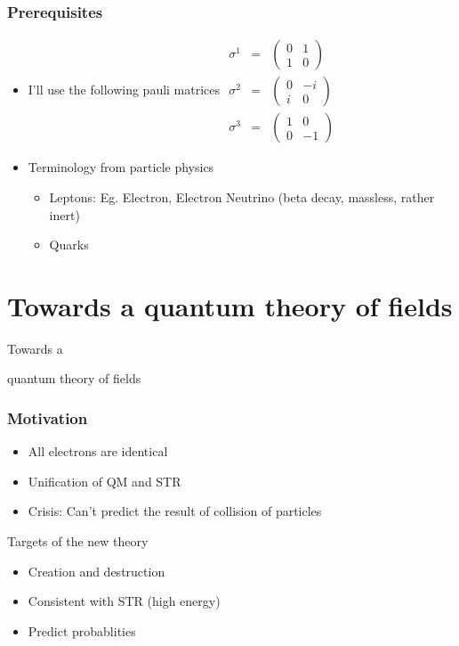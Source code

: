 \documentclass{beamer}
\begin{document}
\begin{frame}
	\frametitle{Prerequisites}
		\begin{itemize}
			\item I'll use the following pauli matrices
			\pause
			$\begin{aligned}\sigma^{1} & = & \left(\begin{array}{cc}
			0 & 1\\
			1 & 0
			\end{array}\right)\\
			\sigma^{2} & = & \left(\begin{array}{cc}
			0 & -i\\
			i & 0
			\end{array}\right)\\
			\sigma^{3} & = & \left(\begin{array}{cc}
			1 & 0\\
			0 & -1
			\end{array}\right)
			\end{aligned}
			 $
			 \pause
 			\item Terminology from particle physics
 			\pause
 			\begin{itemize}
 				\item Leptons: Eg. Electron, Electron Neutrino \pause (beta decay, massless, rather inert)
 				\pause
 				\item Quarks
 			\end{itemize}

		\end{itemize}
\end{frame}

\section{Towards a quantum theory of fields}
\begin{frame}	
	\Huge{\centerline{Towards a}}
	\Huge{\centerline{quantum theory of fields}}
\end{frame}

\begin{frame}
	\frametitle{Motivation}
		\begin{itemize}	
			\item All electrons are identical
			\pause
			\item Unification of QM and STR
			\pause
			\item Crisis: Can't predict the result of collision of particles
		\end{itemize}
		\pause
		Targets of the new theory
		\begin{itemize}
			\item Creation and destruction
			\pause
			\item Consistent with STR (high energy)
			\pause
			\item Predict probablities			
		\end{itemize}
\end{frame}
\end{document}
